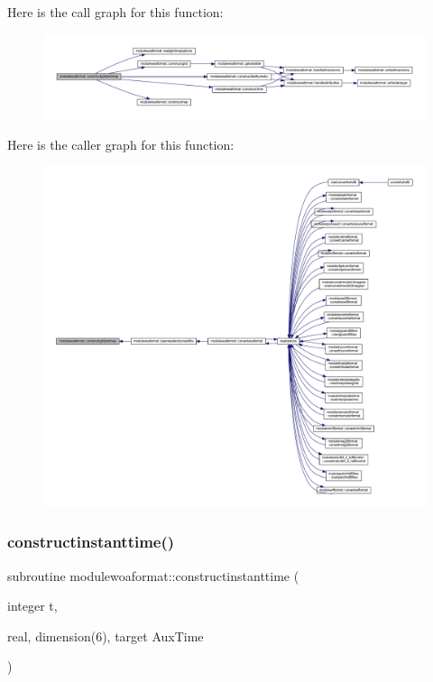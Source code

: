 Here is the call graph for this function\+:\nopagebreak
\begin{figure}[H]
\begin{center}
\leavevmode
\includegraphics[width=350pt]{namespacemodulewoaformat_a8428b35a710ef648826b1b6b2273d34f_cgraph}
\end{center}
\end{figure}
Here is the caller graph for this function\+:\nopagebreak
\begin{figure}[H]
\begin{center}
\leavevmode
\includegraphics[width=350pt]{namespacemodulewoaformat_a8428b35a710ef648826b1b6b2273d34f_icgraph}
\end{center}
\end{figure}
\mbox{\label{namespacemodulewoaformat_abe5b46fe3452046bddc33fbef20098f7}} 
\subsubsection{\texorpdfstring{constructinstanttime()}{constructinstanttime()}}
{\footnotesize\ttfamily subroutine modulewoaformat\+::constructinstanttime (\begin{DoxyParamCaption}\item[{integer}]{t,  }\item[{real, dimension(6), target}]{Aux\+Time }\end{DoxyParamCaption})\hspace{0.3cm}{\ttfamily [private]}}

